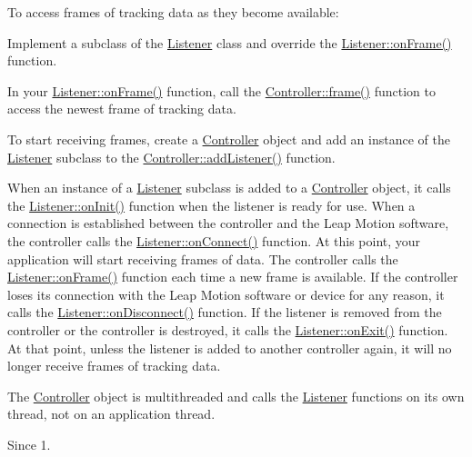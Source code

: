 To access frames of tracking data as they become available\+:


\begin{DoxyEnumerate}
\item Implement a subclass of the \hyperlink{class_leap_1_1_listener}{Listener} class and override the \hyperlink{class_leap_1_1_listener_ab600421108bbc952d8f0f144384ca30f}{Listener\+::on\+Frame()} function.
\item In your \hyperlink{class_leap_1_1_listener_ab600421108bbc952d8f0f144384ca30f}{Listener\+::on\+Frame()} function, call the \hyperlink{class_leap_1_1_controller_a5796b988806ea9fd94e2d987e0e24b32}{Controller\+::frame()} function to access the newest frame of tracking data.
\item To start receiving frames, create a \hyperlink{class_leap_1_1_controller}{Controller} object and add an instance of the \hyperlink{class_leap_1_1_listener}{Listener} subclass to the \hyperlink{class_leap_1_1_controller_a9b6318221593be63a0385748ca66974f}{Controller\+::add\+Listener()} function.
\end{DoxyEnumerate}

When an instance of a \hyperlink{class_leap_1_1_listener}{Listener} subclass is added to a \hyperlink{class_leap_1_1_controller}{Controller} object, it calls the \hyperlink{class_leap_1_1_listener_a180d621ad08afa5851d03d3546a82bbf}{Listener\+::on\+Init()} function when the listener is ready for use. When a connection is established between the controller and the Leap Motion software, the controller calls the \hyperlink{class_leap_1_1_listener_adfef79f9a03b342384aaa17f3a8ebf15}{Listener\+::on\+Connect()} function. At this point, your application will start receiving frames of data. The controller calls the \hyperlink{class_leap_1_1_listener_ab600421108bbc952d8f0f144384ca30f}{Listener\+::on\+Frame()} function each time a new frame is available. If the controller loses its connection with the Leap Motion software or device for any reason, it calls the \hyperlink{class_leap_1_1_listener_ac031e2d95b530097e2060518a9190f5e}{Listener\+::on\+Disconnect()} function. If the listener is removed from the controller or the controller is destroyed, it calls the \hyperlink{class_leap_1_1_listener_ac8f779a9208101f0084953560923f88c}{Listener\+::on\+Exit()} function. At that point, unless the listener is added to another controller again, it will no longer receive frames of tracking data.

The \hyperlink{class_leap_1_1_controller}{Controller} object is multithreaded and calls the \hyperlink{class_leap_1_1_listener}{Listener} functions on its own thread, not on an application thread. \begin{DoxySince}{Since}
1. 
\end{DoxySince}


